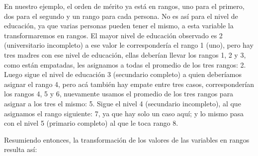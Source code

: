 \documentclass[]{book}
\begin{document}
En nuestro ejemplo, el orden de mérito ya está en rangos, uno para el
primero, dos para el segundo y un rango para cada persona. No es así
para el nivel de educación, ya que varias personas pueden tener el
mismo, a esta variable la transformaremos en rangos. El mayor nivel de
educación observado es 2 (universitario incompleto) a ese valor le
correspondería el rango 1 (uno), pero hay tres madres con ese nivel de
educación, ellas deberían llevar los rangos 1, 2 y 3, como están
empatadas, les asignamos a todas el promedio de los tres rangos: 2.
Luego sigue el nivel de educación 3 (secundario completo) a quien
deberíamos asignar el rango 4, pero acá también hay empate entre tres
casos, corresponderían los rangos 4, 5 y 6, nuevamente usamos el
promedio de los tres rangos para asignar a los tres el mismo: 5. Sigue
el nivel 4 (secundario incompleto), al que asignamos el rango siguiente:
7, ya que hay solo un caso aquí; y lo mismo pasa con el nivel 5
(primario completo) al que le toca rango 8.

Resumiendo entonces, la transformación de los valores de las variables
en rangos resulta así:
\end{document}
